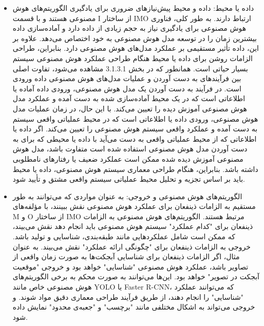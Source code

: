 \documentclass[a4paper,10pt]{article}
\begin{document}
                    \begin{itemize}
                        
                        \item داده یا محیط: داده و محیط پیش‌نیازهای ضروری برای یادگیری الگوریتم‌های هوش مصنوعی هستند و با قسمت I از ساختار IMO ارتباط دارند. به طور کلی، فناوری هوش مصنوعی برای یادگیری نیاز به حجم زیادی از داده دارد و آماده‌سازی داده بیشترین زمان را در توسعه مدل هوش مصنوعی به خود اختصاص می‌دهد. علاوه بر این، داده تأثیر مستقیمی بر عملکرد مدل‌های هوش مصنوعی دارد. بنابراین، طراحی الزامات روشن برای داده یا محیط هنگام طراحی عملکرد هوش مصنوعی سیستم بسیار حیاتی است. همانطور که در بخش 3.1.3.1 مشاهده می‌شود، تفاوت اصلی بین فرآیندهای به دست آوردن و عملیات مدل‌های هوش مصنوعی داده ورودی است. در فرآیند به دست آوردن یک مدل هوش مصنوعی، ورودی داده آماده یا اطلاعاتی است که در یک محیط آماده‌سازی شده به دست آمده و عملکرد مدل هوش مصنوعی آموزش دیده را تعیین می‌کند. با این حال، در زمان عملیات مدل هوش مصنوعی، ورودی داده یا اطلاعاتی است که در محیط عملیاتی واقعی سیستم به دست آمده و عملکرد واقعی سیستم هوش مصنوعی را تعیین می‌کند. اگر داده یا اطلاعاتی که از محیط عملیاتی واقعی به دست می‌آید با داده یا محیطی که برای به دست آوردن مدل هوش مصنوعی استفاده شده است متفاوت باشد، مدل هوش مصنوعی آموزش دیده شده ممکن است عملکرد ضعیف یا رفتارهای نامطلوبی داشته باشد. بنابراین، هنگام طراحی معماری سیستم هوش مصنوعی، داده یا محیط باید بر اساس تجزیه و تحلیل محیط عملیاتی سیستم واقعی مشتق و تأیید شود.

                        \item الگوریتم‌های هوش مصنوعی و خروجی: به عنوان مواردی که می‌توانند به طور مستقیم به الزامات ذینفعان برای عملکرد هوش مصنوعی نقش ببینند، با مؤلفه‌های M و O از ساختار IMO مرتبط هستند. الگوریتم‌های هوش مصنوعی به الزامات ذینفعان برای "کدام عملکرد" سیستم هوش مصنوعی باید انجام دهد نقش می‌بیند، که ممکن است شامل عملکردهایی مانند طبقه‌بندی، شناسایی و تولید باشد. خروجی به الزامات ذینفعان برای "چگونگی ارائه عملکرد" نقش می‌بیند. به عنوان مثال، اگر الزامات ذینفعان برای شناسایی آبجکت‌ها به صورت زمان واقعی از تصاویر باشد، عملکرد هوش مصنوعی "شناسایی" خواهد بود و خروجی "موقعیت آبجکت در تصویر" خواهد بود. این‌ها می‌توانند به صورت محکم به برخی الگوریتم‌های هوش مصنوعی خاص مانند YOLO یا Faster R-CNN، که می‌توانند عملکرد "شناسایی" را انجام دهند، از طریق فرآیند طراحی معماری دقیق مواد شوند. و خروجی می‌تواند به اشکال مختلفی مانند "برچسب" و "جعبه‌ی محدود" نمایش داده شود.


\end{itemize}
\end{document}
